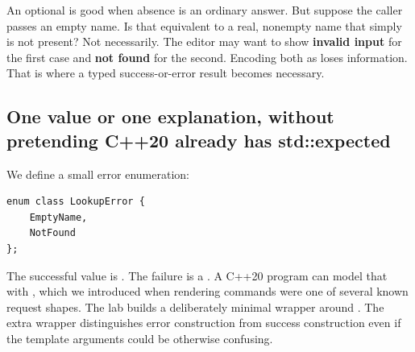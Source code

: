 An optional is good when absence is an ordinary answer. But suppose the caller passes an empty name. Is that equivalent to a real, nonempty name that simply is not present? Not necessarily. The editor may want to show \textbf{invalid input} for the first case and \textbf{not found} for the second. Encoding both as  loses information. That is where a typed success-or-error result becomes necessary.

\subsection{One value or one explanation, without pretending C++20 already has std::expected}\label{01-foundations-i-ch006-one-value-or-one-explanation-without-pretending-c20-already-has-stdexpected}

\hypertarget{01-foundations-i-ch006-one-value-or-one-explanation-without-pretending-c20-already-has-stdexpected}{}

We define a small error enumeration:

\begin{verbatim}
enum class LookupError {
    EmptyName,
    NotFound
};
\end{verbatim}

The successful value is . The failure is a . A C++20 program can model that with , which we introduced when rendering commands were one of several known request shapes. The lab builds a deliberately minimal  wrapper around . The extra  wrapper distinguishes error construction from success construction even if the template arguments could be otherwise confusing.

